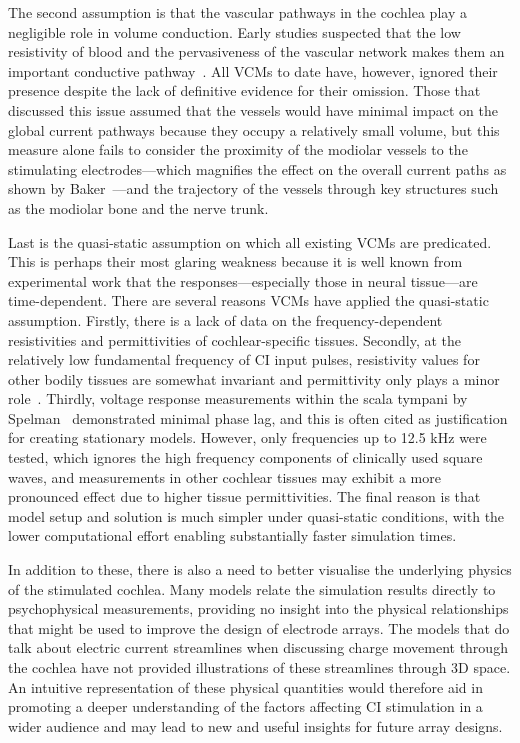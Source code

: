 The second assumption is that the vascular pathways in the cochlea play a
negligible role in volume conduction. Early studies suspected that the low
resistivity of blood and the pervasiveness of the vascular network makes them an
important conductive pathway~\cite{vonbekesy1951,johnstone1966,girzon1987}. All
VCMs to date have, however, ignored their presence despite the lack of
definitive evidence for their omission. Those that discussed this issue assumed
that the vessels would have minimal impact on the global current pathways
because they occupy a relatively small volume, but this measure alone fails to
consider the proximity of the modiolar vessels to the stimulating
electrodes---which magnifies the effect on the overall current paths as shown by
Baker~\cite{baker1989}---and the trajectory of the vessels through key
structures such as the modiolar bone and the nerve trunk.

Last is the quasi-static assumption on which all existing VCMs are predicated.
This is perhaps their most glaring weakness because it is well known from
experimental work that the \invivo{} responses---especially those in neural
tissue---are time-dependent. There are several reasons VCMs have applied the
quasi-static assumption. Firstly, there is a lack of data on the
frequency-dependent resistivities and permittivities of cochlear-specific
tissues. Secondly, at the relatively low fundamental frequency of CI input
pulses, resistivity values for other bodily tissues are somewhat invariant and
permittivity only plays a minor role~\cite{gabriel1996b}. Thirdly, voltage
response measurements within the scala tympani by Spelman~\cite{spelman1982}
demonstrated minimal phase lag, and this is often cited as justification for
creating stationary models. However, only frequencies up to 12.5 kHz were
tested, which ignores the high frequency components of clinically used square
waves, and measurements in other cochlear tissues may exhibit a more pronounced
effect due to higher tissue permittivities. The final reason is that model setup
and solution is much simpler under quasi-static conditions, with the lower
computational effort enabling substantially faster simulation times.

In addition to these, there is also a need to better visualise the underlying
physics of the stimulated cochlea. Many models relate the simulation results
directly to psychophysical measurements, providing no insight into the physical
relationships that might be used to improve the design of electrode arrays.
The models that do talk about electric current streamlines when discussing
charge movement through the cochlea have not provided illustrations of these
streamlines through 3D space. An intuitive representation of these physical
quantities would therefore aid in promoting a deeper understanding of the
factors affecting CI stimulation in a wider audience and may lead to new and
useful insights for future array designs.
